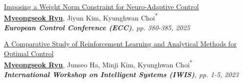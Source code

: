 {\begin{etaremune}
    \item {
        \href{https://doi.org/10.23919/ECC65951.2025.11186942}{Imposing a Weight Norm Constraint for Neuro-Adaptive Control}
        \\
        \textbf{\underline{Myeongseok Ryu}}, Jiyun Kim, Kyunghwan Choi\textsuperscript{{*}}
        \\
        \textit{
            \textbf{European Control Conference (ECC)}, pp. 380-385, 2025
        }
    }

    \item {
        \href{https://doi.org/10.1109/IWIS58789.2023.10284677}{A Comparative Study of Reinforcement Learning and Analytical Methods for Optimal Control}
        \\
        \textbf{\underline{Myeongseok Ryu}}, Junseo Ha, Minji Kim, Kyunghwan Choi\textsuperscript{{*}}
        \\
        \textit{
            \textbf{International Workshop on Intelligent Systems (IWIS)}, pp. 1-5, 2023
        }
    }

\end{etaremune}}
    
